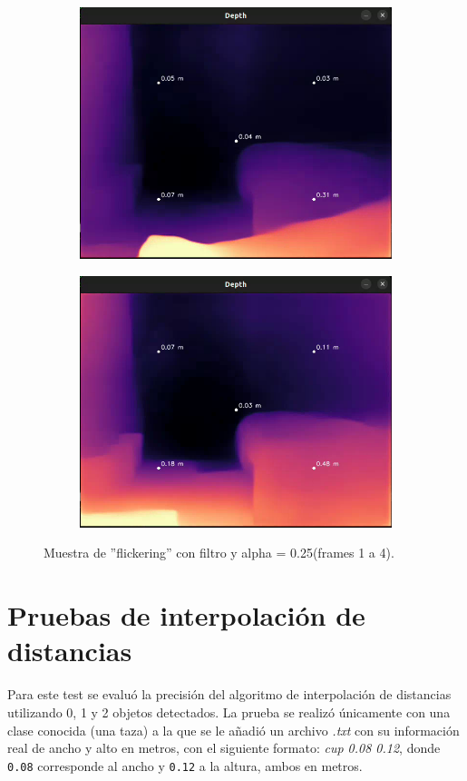 \begin{figure}[H]
\begin{subfigure}[b]{0.45\textwidth}
        \includegraphics[width=\textwidth]{images/filter_a025/frame_00016.png}
    \end{subfigure}
    \hfill
    \begin{subfigure}[b]{0.45\textwidth}
        \includegraphics[width=\textwidth]{images/filter_a025/frame_00024.png}
    \end{subfigure}

    \caption{Muestra de ''flickering'' con filtro  y alpha = 0.25(frames 1 a 4).}
    \label{fig:filter_a025}
\end{figure}
    \section{Pruebas de interpolación de distancias}
Para este test se evaluó la precisión del algoritmo de interpolación de distancias utilizando 0, 1 y 2 objetos detectados. La prueba se realizó únicamente con una clase conocida (una taza) a la que se le añadió un archivo \textit{.txt} con su información real de ancho y alto en metros, con el siguiente formato: \textit{cup 0.08 0.12}, donde \texttt{0.08} corresponde al ancho y \texttt{0.12} a la altura, ambos en metros.

